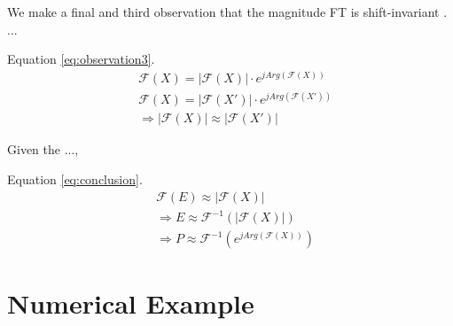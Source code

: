 \documentclass[journal]{IEEEtran}
\begin{document}
We make a final and third observation that the magnitude FT is shift-invariant \cite{proakis1995}. ...

Equation \ref{eq:observation3}.
\begin{equation}
\label{eq:observation3}
\begin{split}
&\mathcal{F}(X) = |\mathcal{F}(X)| \cdot e^{j Arg(\mathcal{F}(X))} \\
&\mathcal{F}(X) = |\mathcal{F}(X')| \cdot e^{j Arg(\mathcal{F}(X'))} \\
&\Rightarrow |\mathcal{F}(X)| \approx |\mathcal{F}(X')|
\end{split}
\end{equation}

Given the ..., 

Equation \ref{eq:conclusion}.
\begin{equation}
\label{eq:conclusion}
\begin{split}
&\mathcal{F}(E) \approx |\mathcal{F}(X)| \\
&\Rightarrow E \approx \mathcal{F}^{-1}(|\mathcal{F}(X)|) \\
&\Rightarrow P \approx \mathcal{F}^{-1}(e^{j Arg(\mathcal{F}(X))})
\end{split}
\end{equation}





\section{Numerical Example} %


\end{document}
